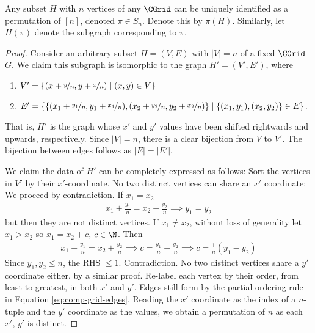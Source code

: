 \begin{fact}
\label{fact:tuple-construction}
Any subset $H$ with $n$ vertices of any $\CGrid$ can be uniquely identified as a permutation of $[n]$, denoted $\pi \in S_n$. Denote this by $\pi(H)$. Similarly, let $H(\pi)$ denote the subgraph corresponding to $\pi$.
\begin{proof}
Consider an arbitrary subset $H = (V,E)$ with $|V| = n$ of a fixed $\CGrid$ $G$. We claim this subgraph is isomorphic to the graph $H' = (V', E')$, where 
\begin{enumerate}
    \item $V' = \{ (x+\nicefrac{y}{n},y+\nicefrac{x}{n}) \mid (x,y) \in V \}$
    \item $E' = \{ \{(x_1+\nicefrac{y_1}{n},y_1+\nicefrac{x_1}{n}), (x_2+\nicefrac{y_2}{n},y_2+\nicefrac{x_2}{n})\} \mid \{(x_1,y_1), (x_2,y_2)\} \in E\}$.
\end{enumerate}
That is, $H'$ is the graph whose $x'$ and $y'$ values have been shifted rightwards and upwards, respectively. Since $|V| = n$, there is a clear bijection from $V$ to $V'$. The bijection between edges follows as $|E| = |E'|$.

We claim the data of $H'$ can be completely expressed as follows: Sort the vertices in $V'$ by their $x'$-coordinate. No two distinct vertices can share an $x'$ coordinate: We proceed by contradiction. If $x_1 = x_2$
\begin{align}
    x_1+\frac{y_1}{n} = x_2+\frac{y_2}{n}
    \implies 
    y_1 = y_2
\end{align}
but then they are not distinct vertices. If $x_1 \neq x_2$, without loss of generality let $x_1 > x_2$ so $x_1 = x_2 + c$, $c \in \N$. Then
\begin{align}
    x_1+\frac{y_1}{n} = x_2+\frac{y_2}{n}
    \implies 
    c = \frac{y_1}{n} - \frac{y_2}{n}
    \implies
    c = \frac{1}{n}(y_1 - y_2)
\end{align}
Since $y_1, y_2 \leq n$, the RHS $\leq 1$. Contradiction. No two distinct vertices share a $y'$ coordinate either, by a similar proof. Re-label each vertex by their order, from least to greatest, in both $x'$ and $y'$. Edges still form by the partial ordering rule in Equation \ref{eq:comp-grid-edges}. Reading the $x'$ coordinate as the index of a $n$-tuple and the $y'$ coordinate as the values, we obtain a permutation of $n$ as each $x'$, $y'$ is distinct.
\end{proof}
\end{fact}

